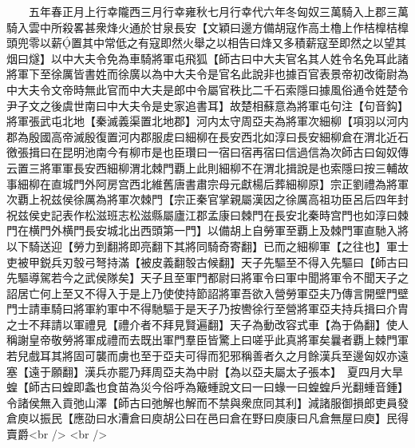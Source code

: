 　　五年春正月上行幸隴西三月行幸雍秋七月行幸代六年冬匈奴三萬騎入上郡三萬騎入雲中所殺畧甚衆烽火通於甘泉長安【文穎曰邊方備胡寇作高土櫓上作桔橰桔橰頭兜零以薪置其中常低之有寇即然火舉之以相告曰烽又多積薪寇至即然之以望其烟曰燧】以中大夫令免為車騎將軍屯飛狐【師古曰中大夫官名其人姓令名免耳此諸將軍下至徐厲皆書姓而徐廣以為中大夫令是官名此說非也據百官表景帝初改衛尉為中大夫令文帝時無此官而中大夫是郎中令屬官秩比二千石索隱曰據風俗通令姓楚令尹子文之後虞世南曰中大夫令是史家追書耳】故楚相蘇意為將軍屯句注【句音鈎】將軍張武屯北地【秦滅義渠置北地郡】河内太守周亞夫為將軍次細柳【項羽以河内郡為殷國高帝滅殷復置河内郡服䖍曰細柳在長安西北如淳曰長安細柳倉在渭北近石徼張揖曰在昆明池南今有柳市是也臣瓚曰一宿曰宿再宿曰信過信為次師古曰匈奴傳云置三將軍軍長安西細柳渭北棘門覇上此則細柳不在渭北揖說是也索隱曰按三輔故事細柳在直城門外阿房宫西北維舊唐書肅宗母元獻楊后葬細柳原】宗正劉禮為將軍次覇上祝兹侯徐厲為將軍次棘門【宗正秦官掌親屬漢因之徐厲高祖功臣呂后四年封祝兹侯史記表作松滋班志松滋縣屬廬江郡孟康曰棘門在長安北秦時宫門也如淳曰棘門在横門外横門長安城北出西頭第一門】以備胡上自勞軍至覇上及棘門軍直馳入將以下騎送迎【勞力到翻將即亮翻下其將同騎奇寄翻】已而之細柳軍【之往也】軍士吏被甲鋭兵刃彀弓弩持滿【被皮義翻彀古候翻】天子先驅至不得入先驅曰【師古曰先驅導駕若今之武侯隊矣】天子且至軍門都尉曰將軍令曰軍中聞將軍令不聞天子之詔居亡何上至又不得入于是上乃使使持節詔將軍吾欲入營勞軍亞夫乃傳言開壁門壁門士請車騎曰將軍約軍中不得馳驅于是天子乃按轡徐行至營將軍亞夫持兵揖曰介胄之士不拜請以軍禮見【禮介者不拜見賢遍翻】天子為動改容式車【為于偽翻】使人稱謝皇帝敬勞將軍成禮而去既出軍門羣臣皆驚上曰嗟乎此真將軍矣曩者覇上棘門軍若兒戲耳其將固可襲而虜也至于亞夫可得而犯邪稱善者久之月餘漢兵至邊匈奴亦遠塞【遠于願翻】漢兵亦罷乃拜周亞夫為中尉【為以亞夫屬太子張本】　夏四月大旱蝗【師古曰蝗即螽也食苗為災今俗呼為簸蝩說文曰一曰蝝一曰蝗蝗戶光翻蝩音鍾】令諸侯無入貢弛山澤【師古曰弛解也解而不禁與衆庶同其利】減諸服御損郎吏員發倉庾以振民【應劭曰水漕倉曰庾胡公曰在邑曰倉在野曰庾康曰凡倉無屋曰庾】民得賣爵<br />
<br />
